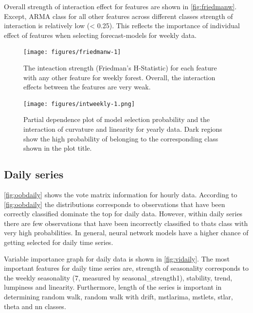 \documentclass[11pt,a4paper,]{article}
\begin{document}
Overall strength of interaction effect for features are shown in \autoref{fig:friedmanw}. Except, ARMA class for all other features across different classes strength of interaction is relatively low (\textless{} 0.25). This reflects the importance of individual effect of features when selecting forecast-models for weekly data.

\begin{figure}[h]

{\centering \texttt{[image: figures/friedmanw-1]} 

}

\caption{The inteaction strength (Friedman's H-Statistic) for each feature with any other feature for weekly forest. Overall, the interaction effects between the features are very weak.}\label{fig:friedmanw}
\end{figure}

\begin{figure}
\centering
\texttt{[image: figures/intweekly-1.png]}
\caption{\label{fig:intweekly}Partial dependence plot of model selection probability and the interaction of curvature and linearity for yearly data. Dark regions show the high probability of belonging to the corresponding class shown in the plot title.}
\end{figure}

\newpage

\hypertarget{daily-series}{%
\subsection{Daily series}\label{daily-series}}

\autoref{fig:oobdaily} shows the vote matrix information for hourly data. According to \autoref{fig:oobdaily} the distributions corresponds to observations that have been correctly classified dominate the top for daily data. However, within daily series there are few observations that have been incorrectly classified to tbats class with very high probabilities. In general, neural network models have a higher chance of getting selected for daily time series.

Variable importance graph for daily data is shown in \autoref{fig:vidaily}. The most important features for daily time series are, strength of seasonality corresponds to the weekly seasonality (7, measured by seasonal\_strength1), stability, trend, lumpiness and linearity. Furthermore, length of the series is important in determining random walk, random walk with drift, mstlarima, mstlets, stlar, theta and nn classes.
\end{document}
